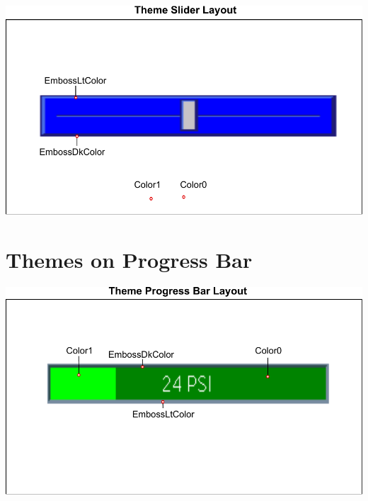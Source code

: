 \begin{DoxyImageNoCaption}
  \mbox{\includegraphics{themeSlider}}
\end{DoxyImageNoCaption}
 \hypertarget{intro_themes_themeProgress}{}\section{Themes on Progress Bar}\label{intro_themes_themeProgress}
 
\begin{DoxyImageNoCaption}
  \mbox{\includegraphics{themeProgress}}
\end{DoxyImageNoCaption}
 